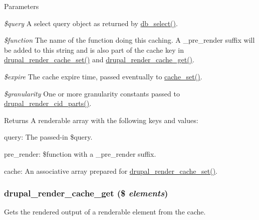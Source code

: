 \begin{DoxyParams}{Parameters}
\item[{\em \$query}]A select query object as returned by \hyperlink{group__database_ga9e030cee657d64e3d8e524c65814cc9f}{db\_\-select()}. \item[{\em \$function}]The name of the function doing this caching. A \_\-pre\_\-render suffix will be added to this string and is also part of the cache key in \hyperlink{common_8inc_aee3169994180319d0fe2b1738825c54c}{drupal\_\-render\_\-cache\_\-set()} and \hyperlink{common_8inc_a8726783745547f4686cea624be0b0562}{drupal\_\-render\_\-cache\_\-get()}. \item[{\em \$expire}]The cache expire time, passed eventually to \hyperlink{includes_2cache_8inc_a48081f36334909f561ef4f538fa640d2}{cache\_\-set()}. \item[{\em \$granularity}]One or more granularity constants passed to \hyperlink{common_8inc_ae2cdc2f17d6e9fe1bbc162b40e94bd5d}{drupal\_\-render\_\-cid\_\-parts()}.\end{DoxyParams}
\begin{DoxyReturn}{Returns}
A renderable array with the following keys and values:
\begin{DoxyItemize}
\item query: The passed-\/in \$query.
\item pre\_\-render: \$function with a \_\-pre\_\-render suffix.
\item cache: An associative array prepared for \hyperlink{common_8inc_aee3169994180319d0fe2b1738825c54c}{drupal\_\-render\_\-cache\_\-set()}. 
\end{DoxyItemize}
\end{DoxyReturn}
\hypertarget{common_8inc_a8726783745547f4686cea624be0b0562}{
\subsubsection[{drupal\_\-render\_\-cache\_\-get}]{\setlength{\rightskip}{0pt plus 5cm}drupal\_\-render\_\-cache\_\-get (\$ {\em elements})}}
\label{common_8inc_a8726783745547f4686cea624be0b0562}
Gets the rendered output of a renderable element from the cache.


